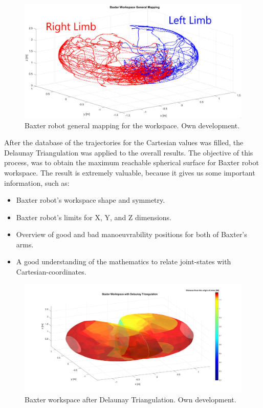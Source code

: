 \documentclass[11pt]{report} %
\begin{document}
\begin{figure}[H]
    \centering
    \includegraphics[width=0.92\linewidth]{assets/imgs/baxter_robot/baxter_workspace_general_mapping.png}
    \caption{Baxter robot general mapping for the workspace. Own development.} 
    \label{fig_baxter_general_workspace}
\end{figure}

After the database of the trajectories for the Cartesian values was filled, the Delaunay Triangulation was applied to the overall results. The objective of this process, was to obtain the maximum reachable spherical surface for Baxter robot workspace. The result is extremely valuable, because it gives us some important information, such as:

\begin{itemize}
    \item Baxter robot's workspace shape and symmetry.
    \item Baxter robot's limits for X, Y, and Z dimensions.
    \item Overview of good and bad manoeuvrability positions for both of Baxter's arms.
    \item A good understanding of the mathematics to relate joint-states with Cartesian-coordinates.
\end{itemize}


\begin{figure}[H]
    \centering
    \includegraphics[width=1.0\linewidth]{assets/imgs/baxter_robot/baxter_workspace_delaunay_triangulation.png}
    \caption{Baxter workspace after Delaunay Triangulation. Own development.} 
    \label{fig_workspace_after_delaunay_triangulation}
\end{figure}
\end{document}
